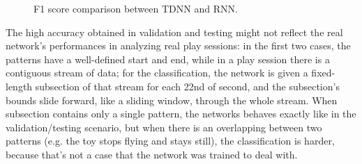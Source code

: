 \begin{center}
	\begin{figure}[ht!]
		\caption{F1 score comparison between TDNN and RNN.}
	\end{figure}
\end{center}
\clearpage

The high accuracy obtained in validation and testing might not reflect the real network's performances in analyzing real play sessions: in the first two cases, the patterns have a well-defined start and end, while in a play session there is a contiguous stream of data; for the classification, the network is given a fixed-length subsection of that stream for each 22nd of second, and the subsection's bounds slide forward, like a sliding window, through the whole stream. When subsection contains only a single pattern, the networks behaves exactly like in the validation/testing scenario, but when there is an overlapping between two patterns (e.g. the toy stops flying and stays still), the classification is harder, because that's not a case that the network was trained to deal with.
\bigbreak

